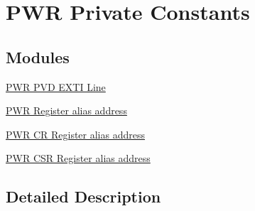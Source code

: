 \hypertarget{group___p_w_r___private___constants}{}\section{P\+WR Private Constants}
\label{group___p_w_r___private___constants}
\subsection*{Modules}
\begin{DoxyCompactItemize}
\item 
\hyperlink{group___p_w_r___p_v_d___e_x_t_i___line}{P\+W\+R P\+V\+D E\+X\+T\+I Line}
\item 
\hyperlink{group___p_w_r__register__alias__address}{P\+W\+R Register alias address}
\item 
\hyperlink{group___p_w_r___c_r__register__alias}{P\+W\+R C\+R Register alias address}
\item 
\hyperlink{group___p_w_r___c_s_r__register__alias}{P\+W\+R C\+S\+R Register alias address}
\end{DoxyCompactItemize}


\subsection{Detailed Description}
